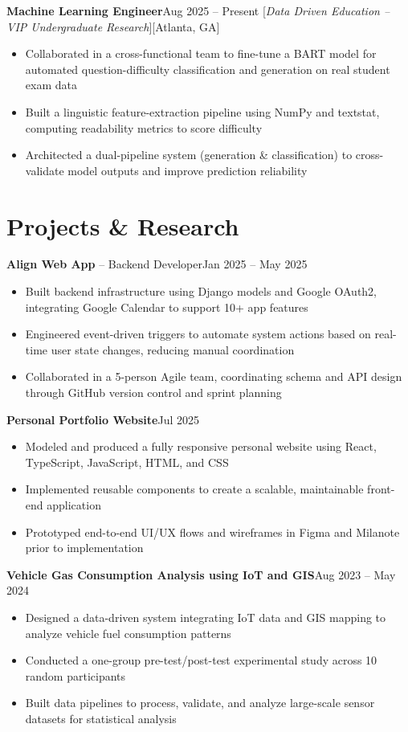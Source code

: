 \documentclass[letterpaper,10.5pt]{article}
\newcommand{\resumeItem}[1]{
  \item \small{#1 \vspace{-1pt}}
}
\newcommand{\resumeItemListStart}{
  \begin{itemize}[
    leftmargin=1.5em,
    itemsep=1pt,
    topsep=2pt,
    parsep=0pt
  ]
}
\newcommand{\resumeItemListEnd}{\end{itemize}\vspace{-3pt}}
\begin{document}
    \begin{itemize}[leftmargin=*,nosep]
      \resumeProjectHeading
          {\textbf{Machine Learning Engineer}}{Aug 2025 -- Present}
          [\textit{Data Driven Education -- VIP Undergraduate Research}][Atlanta, GA]
          \resumeItemListStart
            \resumeItem{Collaborated in a cross-functional team to fine-tune a BART model for automated question-difficulty classification and generation on real student exam data}
            \resumeItem{Built a linguistic feature-extraction pipeline using NumPy and textstat, computing readability metrics to score difficulty}
            \resumeItem{Architected a dual-pipeline system (generation \& classification) to cross-validate model outputs and improve prediction reliability}
          \resumeItemListEnd
    \end{itemize}
\section{\textbf{Projects \& Research}}
     \begin{itemize}[leftmargin=*,nosep]
      \resumeProjectHeading
          {\textbf{Align Web App} – Backend Developer}{Jan 2025 -- May 2025}
          \resumeItemListStart
            \resumeItem{Built backend infrastructure using Django models and Google OAuth2, integrating Google Calendar to support 10+ app features}
            \resumeItem{Engineered event-driven triggers to automate system actions based on real-time user state changes, reducing manual coordination}
            \resumeItem{Collaborated in a 5-person Agile team, coordinating schema and API design through GitHub version control and sprint planning}
          \resumeItemListEnd
    \end{itemize}
    \begin{itemize}[leftmargin=*,nosep]
      \resumeProjectHeading
          {\textbf{Personal Portfolio Website}}{Jul 2025}
          \resumeItemListStart
            \resumeItem{Modeled and produced a fully responsive personal website using React, TypeScript, JavaScript, HTML, and CSS}
            \resumeItem{Implemented reusable components to create a scalable, maintainable front-end application}
            \resumeItem{Prototyped end-to-end UI/UX flows and wireframes in Figma and Milanote prior to implementation}
          \resumeItemListEnd
    \end{itemize}
    \begin{itemize}[leftmargin=*,nosep]
      \resumeProjectHeading
          {\textbf{Vehicle Gas Consumption Analysis using IoT and GIS}}{Aug 2023 -- May 2024}
          \resumeItemListStart
            \resumeItem{Designed a data-driven system integrating IoT data and GIS mapping
  to analyze vehicle fuel consumption patterns}
            \resumeItem{Conducted a one-group pre-test/post-test experimental study across 10 random participants}
            \resumeItem{Built data pipelines to process, validate, and analyze large-scale sensor datasets for statistical analysis}
          \resumeItemListEnd
    \end{itemize}
\end{document}
